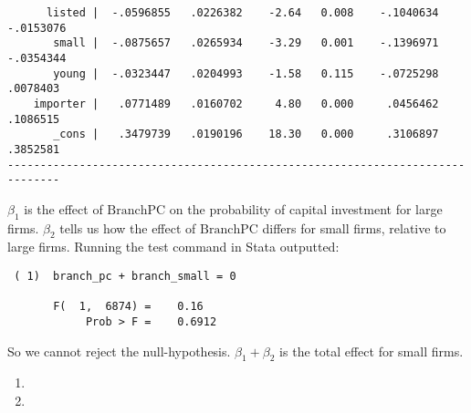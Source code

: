 \documentclass[11pt,twoside,openany]{memoir}
\begin{document}
\begin{question}
\begin{enumerate}[label = (\alph*),itemsep=1pt,topsep=3pt]
{\begin{solution}
\begin{Verbatim}
      listed |  -.0596855   .0226382    -2.64   0.008    -.1040634   -.0153076
       small |  -.0875657   .0265934    -3.29   0.001    -.1396971   -.0354344
       young |  -.0323447   .0204993    -1.58   0.115    -.0725298    .0078403
    importer |   .0771489   .0160702     4.80   0.000     .0456462    .1086515
       _cons |   .3479739   .0190196    18.30   0.000     .3106897    .3852581
------------------------------------------------------------------------------                    
                \end{Verbatim}
                $\beta_1$ is the effect of $\text{BranchPC}$ on the probability of capital investment for large firms. $\beta_2$ tells us how the effect of $\text{BranchPC}$ differs for small firms, relative to large firms. Running the test command in Stata outputted:
                    \begin{Verbatim}
 ( 1)  branch_pc + branch_small = 0

       F(  1,  6874) =    0.16
            Prob > F =    0.6912
                    \end{Verbatim}
                So we cannot reject the null-hypothesis. $\beta_1 + \beta_2$ is the total effect for small firms.
            \end{solution}}
    \end{enumerate}
\end{question}
\begin{question}
    \phantom{a}
    \begin{enumerate}[label = (\alph*),itemsep=1pt,topsep=3pt]
        \item
        \item 
    \end{enumerate}
\end{question}
\end{document}
